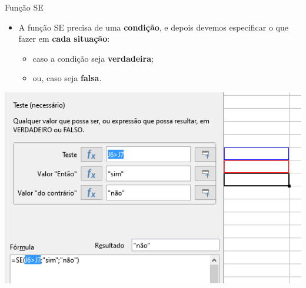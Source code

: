 \begin{frame}{Função SE}
	\begin{block}{}
		\begin{itemize}
			\item A função SE precisa de uma \textbf{condição}, e depois devemos especificar o que fazer em \textbf{cada situação}:
			\begin{itemize}
				\item\normalsize caso a condição seja \textbf{verdadeira};
				\item\normalsize ou, caso seja \textbf{falsa}.
			\end{itemize}
		\end{itemize}
	\end{block}
	
	\centering
	\includegraphics[width=0.65\linewidth]{Figuras/Ch06/fig46}
\end{frame}


